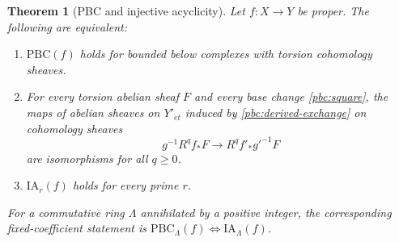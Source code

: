 \documentclass[11pt,a4paper]{article}
\numberwithin{equation}{section}
\newtheorem{theorem}{Theorem}[section]
\theoremstyle{definition}
\theoremstyle{remark}
\newcommand{\et}{\acute{e}t}
\begin{document}
\begin{theorem}[PBC and injective acyclicity]\label{pbc:ia-equivalence}
Let $f:X\to Y$ be proper. The following are equivalent:
\begin{enumerate}[label=(\roman*)]
\item $\mathrm{PBC}(f)$ holds for bounded below complexes with torsion
  cohomology sheaves.
\item For every torsion abelian sheaf $F$ and every base change
  \eqref{pbc:square}, the maps of abelian sheaves on $Y'_{\et}$
  induced by \eqref{pbc:derived-exchange} on cohomology sheaves
  \[
   g^{-1}R^qf_*F\longrightarrow R^qf'_*g'^{-1}F
  \]
  are isomorphisms for all $q\geq0$.
\item $\mathrm{IA}_r(f)$ holds for every prime $r$.
\end{enumerate}
For a commutative ring $\Lambda$ annihilated by a positive integer,
the corresponding fixed-coefficient statement is
$\mathrm{PBC}_{\Lambda}(f)\Longleftrightarrow
\mathrm{IA}_{\Lambda}(f)$.
\end{theorem}
\end{document}
